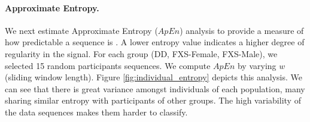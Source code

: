 \documentclass{llncs}
\begin{document}
  \paragraph{Approximate Entropy.} We next estimate Approximate Entropy ($ApEn$) analysis to provide a measure of how predictable a sequence is \cite{Restrepo:2014gs,entrophy} . A lower entropy value indicates a higher degree of regularity in the signal. For each group (DD, FXS-Female, FXS-Male), we selected 15 random participants sequences. We compute $ApEn$ by varying $w$ (sliding window length). Figure \ref{fig:individual_entropy} depicts this analysis. We can see that there is great variance amongst individuals of each population, many sharing similar entropy with participants of other groups. The high variability of the data sequences makes them harder to classify.    
\end{document}
